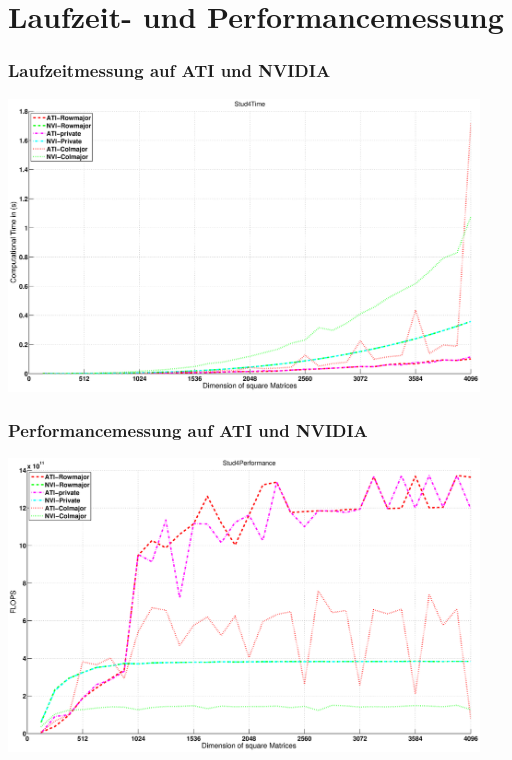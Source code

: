 \documentclass{beamer}
\begin{document}
\section{Laufzeit- und Performancemessung}
\begin{frame}
\frametitle{Laufzeitmessung auf ATI und NVIDIA}
\begin{center}
\includegraphics[width=12.5cm]{Stud4Time}
\end{center}

\end{frame}

\begin{frame}
\frametitle{Performancemessung auf ATI und NVIDIA}
\begin{center}
\includegraphics[width=12.5cm]{Stud4Performance}
\end{center}

\end{frame}
\end{document}
